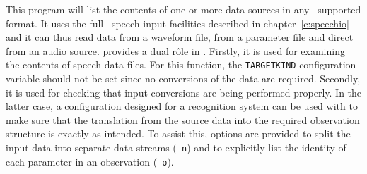 %
%

\newpage
{}


This program will list the contents of one or more
data sources in any \HTK\ supported format.  It uses the full \HTK\ speech
input facilities described in chapter~\ref{c:speechio} and it can thus
read data from a waveform file, from a parameter file and direct from
an audio source.   provides
a dual r\^{o}le in \HTK.  Firstly, it is used for examining the contents
of speech data files.  For this function, the \texttt{TARGETKIND} configuration
variable should not be set since no conversions
of the data are required.
Secondly, it is used for checking that input 
conversions are being performed properly.  In the latter case, a configuration
designed for a recognition system can be used with  to
make sure that the translation from the source data into the required
observation structure is exactly as intended.  To assist  this, options
are provided to split the input data into separate data streams (\texttt{-n})
and to explicitly list the identity of each parameter in an observation
(\texttt{-o}).


